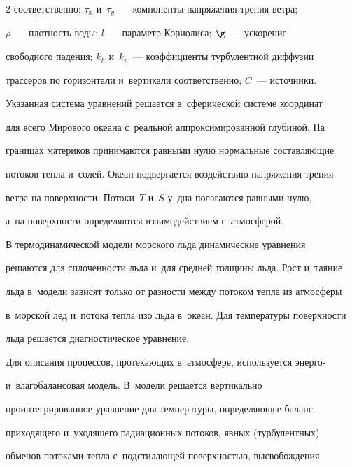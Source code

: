 \begin{multicols}{2}
соответственно; $\tau_x$ и~$\tau_y$~--- компоненты напряжения трения ветра; 


$\rho$~--- плотность воды; $l$~--- параметр Кориолиса; $\g$~--- ускорение 


свободного падения; $k_h$ и~$k_v$~--- коэффициенты турбулентной диффузии 


трассеров по горизонтали и~вертикали соответственно; $C$~--- источники.





  Указанная система уравнений решается в~сферической системе координат 


для всего Мирового океана с~реальной аппроксимированной глубиной. На 


границах материков принимаются равными нулю нормальные составляющие 


потоков тепла и~солей. Океан подвергается воздействию напряжения трения 


ветра на поверхности. Потоки~$T$ и~$S$ у~дна полагаются равными нулю, 


а~на поверхности определяются взаимодействием с~атмосферой. 


  


  В термодинамической модели морского льда динамические уравнения 


решаются для сплоченности льда и~для средней толщины льда. Рост и~таяние 


льда в~модели зависят только от разности между потоком тепла из атмосферы 


в~морской лед и~потока тепла изо льда в~океан. Для температуры по\-верх\-ности 


льда решается диагностическое урав\-нение.


{





} 


  


  Для описания процессов, протекающих в~атмосфере, используется энерго- 


и~влагобалансовая модель. В~модели решается вертикально 


проинтегрированное уравнение для температуры, определяющее баланс 


приходящего и~уходящего радиационных потоков, явных (турбулентных) 


обменов потоками тепла с~подстилающей по\-верх\-ностью, высвобождения 



\end{multicols}
